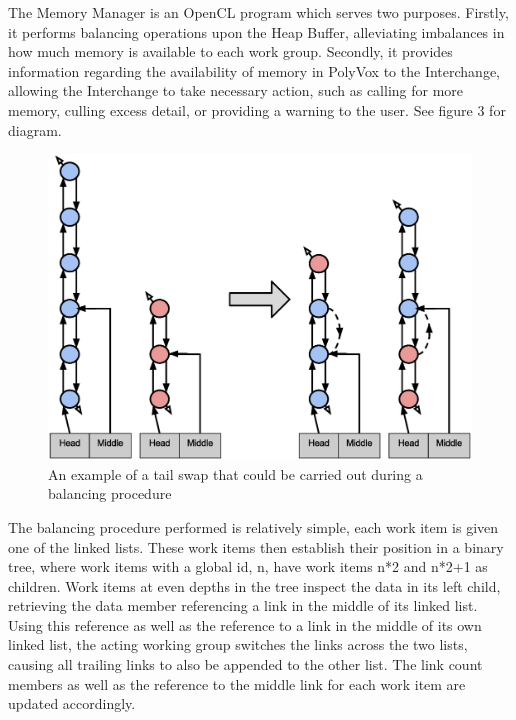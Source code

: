 \documentclass[onecolumn, draftclsnofoot,10pt, compsoc]{IEEEtran}
\newcounter{threesection}[subsubsection]
\newcounter{foursection}[threesection]
\begin{document}

The Memory Manager is an OpenCL program which serves two purposes.
Firstly, it performs balancing operations upon the Heap Buffer, alleviating imbalances in how much memory is available to each work group.
Secondly, it provides information regarding the availability of memory in PolyVox to the Interchange, allowing the Interchange to take necessary action, such as calling for more memory, culling excess detail, or providing a warning to the user.
See figure 3 for diagram.



\begin{figure}[H]
\begin{center}
\includegraphics[width=\textwidth]{TailSwap.eps}
\caption{An example of a tail swap that could be carried out during a balancing procedure}
\end{center}
\end{figure}


The balancing procedure performed is relatively simple, each work item is given one of the linked lists.
These work items then establish their position in a binary tree, where work items with a global id, n, have work items n*2 and n*2+1 as children.
Work items at even depths in the tree inspect the data in its left child, retrieving the data member referencing a link in the middle of its linked list.
Using this reference as well as the reference to a link in the middle of its own linked list, the acting working group switches the links across the two lists, causing all trailing links to also be appended to the other list.
The link count members as well as the reference to the middle link for each work item are updated accordingly.
\end{document}

